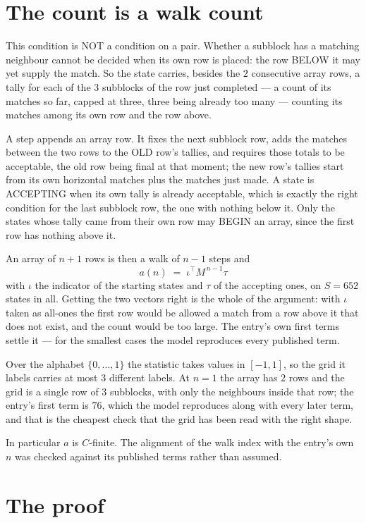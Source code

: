 \documentclass[11pt,a4paper]{article}
\theoremstyle{plain}
\theoremstyle{definition}
\begin{document}
\section{The count is a walk count}

This condition is NOT a condition on a pair. Whether a subblock has a
matching neighbour cannot be decided when its own row is placed: the row BELOW it may yet
supply the match. So the state carries, besides the $2$ consecutive array rows, a tally for
each of the $3$ subblocks of the row just completed --- a count of its matches so far, capped at three, three being already too many --- counting its matches
among its own row and the row above.

A step appends an array row. It fixes the next subblock row, adds the matches between the two
rows to the OLD row's tallies, and requires those totals to be acceptable, the old row being
final at that moment; the new row's tallies start from its own horizontal matches plus the
matches just made. A state is ACCEPTING when its own tally is already acceptable, which is
exactly the right condition for the last subblock row, the one with nothing below it. Only the
states whose tally came from their own row may BEGIN an array, since the first row has nothing
above it.

An array of $n+1$ rows is then a walk of $n-1$ steps and
\[
a(n)\;=\;\iota^{\!\top}M^{\,n-1}\tau
\]
with $\iota$ the indicator of the starting states and $\tau$ of the accepting ones, on
$S=652$ states in all. Getting the two vectors right is the whole of the argument: with
$\iota$ taken as all-ones the first row would be allowed a match from a row above it that does
not exist, and the count would be too large. The entry's own first terms settle it --- for
the smallest cases
the model reproduces every published term.

Over the alphabet $\{0,\dots,1\}$ the statistic takes values in $[-1,1]$, so the
grid it labels carries at most $3$ different labels. At $n=1$ the array has $2$
rows and the grid is a single row of $3$
subblocks, with only the neighbours inside that row; the entry's first term is
$76$, which the model reproduces along with every later term, and that is the cheapest
check that the grid has been read with the right shape.

In particular $a$ is $C$-finite. The alignment of the walk index with the entry's own $n$ was
checked against its published terms rather than assumed.

\section{The proof}
\end{document}
